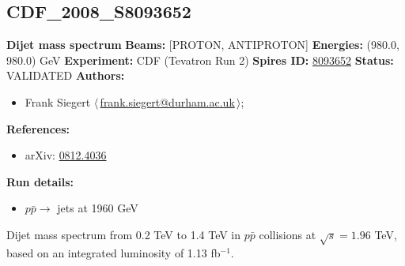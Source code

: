 \clearpage


\clearpage

\subsection[CDF\_2008\_S8093652]{CDF\_2008\_S8093652\,\cite{Aaltonen:2008dn}}
\textbf{Dijet mass spectrum}\newline
\textbf{Beams:} [PROTON, ANTIPROTON] \newline
\textbf{Energies:} (980.0, 980.0) GeV \newline
\textbf{Experiment:} CDF (Tevatron Run 2) \newline
\textbf{Spires ID:} \href{http://www.slac.stanford.edu/spires/find/hep/www?rawcmd=key+8093652}{8093652}\newline
\textbf{Status:} VALIDATED\newline
\textbf{Authors:}
\begin{itemize}
  \item Frank Siegert $\langle\,$\href{mailto:frank.siegert@durham.ac.uk}{frank.siegert@durham.ac.uk}$\,\rangle$;
\end{itemize}
\textbf{References:}
\begin{itemize}
  \item arXiv: \href{http://arxiv.org/abs/0812.4036}{0812.4036}
\end{itemize}
\textbf{Run details:}
\begin{itemize}

  \item $p \bar{p} \to$ jets at 1960 GeV\end{itemize}

\noindent Dijet mass spectrum  from 0.2 TeV to 1.4 TeV in $p \bar{p}$ collisions at $\sqrt{s} = 1.96$ TeV, based on an integrated luminosity of 1.13 fb$^{-1}$.

\clearpage


\clearpage

